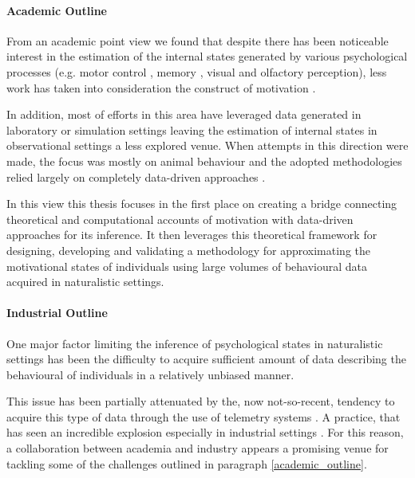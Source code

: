 \paragraph*{Academic Outline}
\label{academic_outline}
From an academic point view we found that despite there has been noticeable interest in the estimation of the internal states generated by various psychological processes (e.g. motor control \cite{gallego2017neural}, memory \cite{derdikman2011manifold, nieh2021geometry}, visual \cite{seung2000manifold, ganmor2015thesaurus} and olfactory \cite{stopfer2003intensity} perception), less work has taken into consideration the construct of motivation \cite{mcclure2003computational, zhang2009neural}. 

In addition, most of efforts in this area have leveraged data generated in laboratory or simulation settings \cite{eyjolfsdottir2016learning, song2017reward, merel2019deep,calhoun2019unsupervised, seung2000manifold, pang2016dimensionality, luxem2020identifying, pereira2020quantifying, mccullough2021unsupervised, shi2021learning} leaving the estimation of internal states in observational settings a less explored venue. When attempts in this direction were made, the focus was mostly on animal behaviour and the adopted methodologies relied largely on completely data-driven approaches \cite{luxem2020identifying,pereira2020quantifying, mccullough2021unsupervised}. 

In this view this thesis focuses in the first place on creating a bridge connecting theoretical and computational accounts of motivation with data-driven approaches for its inference. It then leverages this theoretical framework for designing, developing and validating a methodology for approximating the motivational states of individuals using large volumes of behavioural data acquired in naturalistic settings. 

\paragraph*{Industrial Outline}
\label{industrial_outline}
One major factor limiting the inference of psychological states in naturalistic settings has been the difficulty to acquire sufficient amount of data describing the behavioural of individuals in a relatively unbiased manner. 

This issue has been partially attenuated by the, now not-so-recent, tendency to acquire this type of data through the use of telemetry systems \cite{el2016game, drachen2015behavioral}. A practice, that has seen an incredible explosion especially in industrial settings \cite{el2016game, drachen2015behavioral,EUdataregulations2018}. For this reason, a collaboration between academia and industry appears a promising venue for tackling some of the challenges outlined in paragraph \ref{academic_outline}. 

